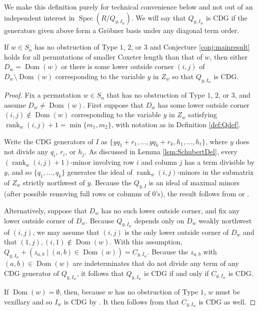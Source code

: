\documentclass[ALCO,Unicode,published]{cedram}
\DeclareMathOperator{\rank}{rank}
\DeclareMathOperator{\Spec}{Spec}
\DeclareMathOperator{\Dom}{Dom}
\begin{document}
We make this definition purely for technical convenience below and not out of an independent interest in $\Spec(R/Q_{y,I_w})$.  We will say that $Q_{y,I_w}$ is CDG if the generators given above form a Gr\"obner basis under any diagonal term order.  

\begin{lemma}\label{lem:GrobnerQs}
If $w \in S_n$ has no obstruction of Type $1$, $2$, or $3$ and Conjecture \ref{conj:mainresult} holds for all permutations of smaller Coxeter length than that of $w$, then either $D_w = \Dom(w)$ or there is some lower outside corner $(i,j)$ of $D_w \setminus \Dom(w)$ corresponding to the variable $y$ in $Z_w$ so that $Q_{y,I_w}$ is CDG.
\end{lemma}
\begin{proof}
Fix a permutation $w \in S_n$ that has no obstruction of Type $1$, $2$, or $3$, and assume $D_w \neq \Dom(w)$.  First suppose that $D_w$ has some lower outside corner $(i,j)\notin \Dom(w)$ corresponding to the variable $y$ in $Z_w$ satisfying $\rank_w(i,j)+1 = \min\{m_1,m_2\}$, with notation as in Definition \ref{def:Qdef}.  

Write the CDG generators of $I$ as $\{yq_1+r_1, \ldots, yq_k+r_k, h_1, \ldots, h_\ell \}$, where $y$ does not divide any $q_i$, $r_i$, or $h_j$.  As discussed in Lemma \ref{lem:SchubertDel}, every $(\rank_w(i,j)+1)$-minor involving row $i$ and column $j$ has a term divisible by $y$, and so $\{q_1, \ldots, q_k\}$ generates the ideal of $\rank_w(i,j)$-minors in the submatrix of $Z_w$ strictly northwest of $y$.  Because the $Q_{y,I}$ is an ideal of maximal minors (after possible removing full rows or columns of $0$'s), the result follows from \cite[Theorem 4.2]{CDG15} or \cite[Proposition 5.4]{Boo11}.  

Alternatively, suppose that $D_w$ has no such lower outside corner, and fix any lower outside corner of $D_w$.  Because $Q_{y,I_w}$ depends only on $D_w$ weakly northwest of $(i,j)$, we may assume that $(i,j)$ is the only lower outside corner of $D_w$ and that $(1,j), (i,1) \notin \Dom(w)$.  With this assumption, $Q_{y,I_w} +(z_{a,b} \mid (a,b) \in \Dom(w))= C_{y,I_w}$.  Because the $z_{a,b}$ with $(a,b) \in \Dom(w)$ are indeterminates that do not divide any term of any CDG generator of $Q_{y,I_w}$, it follows that $Q_{y,I_w}$ is CDG if and only if $C_{y,I_w}$ is CDG.  

If $\Dom(w) = \emptyset$, then, because $w$ has no obstruction of Type $1$, $w$ must be vexillary and so $I_w$ is CDG by \cite[Theorem 3.8]{KMY09}.   It then follows from  \cite[Theorem 2.1(a)]{KMY09} that $C_{y,I_w}$ is CDG as well.  


\end{proof}
\end{document}
